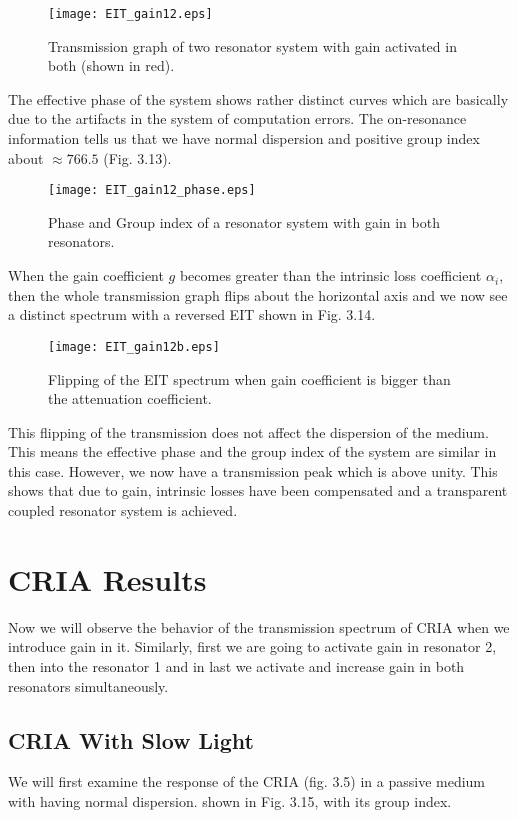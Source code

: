 \begin{figure}[h]
\centering
\texttt{[image: EIT\_gain12.eps]}
\caption{Transmission graph of two resonator system with gain activated in both (shown in red).}
\end{figure}

The effective phase of the system shows rather distinct curves which are basically due to the artifacts in the system of computation errors. The on-resonance information tells us that we have normal dispersion and positive group index about $\approx 766.5$ (Fig. 3.13). 

\begin{figure}[h]
\centering
\texttt{[image: EIT\_gain12\_phase.eps]}
\caption{Phase and Group index of a resonator system with gain in both resonators.}
\end{figure}

When the gain coefficient $g$ becomes greater than the intrinsic loss coefficient $\alpha_{i}$, then the whole transmission graph flips about the horizontal axis and we now see a distinct spectrum with a reversed EIT shown in Fig. 3.14.

\begin{figure}[h]
\centering
\texttt{[image: EIT\_gain12b.eps]}
\caption{Flipping of the EIT spectrum when gain coefficient is bigger than the attenuation coefficient.}
\end{figure}

This flipping of the transmission does not affect the dispersion of the medium. This means the effective phase and the group index of the system are similar in this case. However, we now have a transmission peak which is above unity. This shows that due to gain, intrinsic losses have been compensated and a transparent coupled resonator system is achieved.


  

\section{CRIA Results}
Now we will observe the behavior of the transmission spectrum of CRIA when we introduce gain in it. Similarly, first we are going to activate gain in resonator 2, then into the resonator 1 and in last we activate and increase gain in both resonators simultaneously. 

\subsection{CRIA With Slow Light}
We will first examine the response of the CRIA (fig. 3.5) in a passive medium with having normal dispersion. shown in Fig. 3.15, with its group index.

